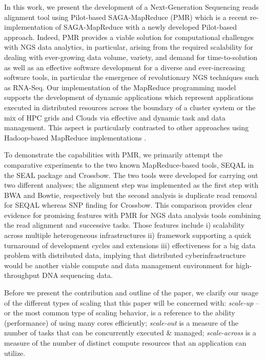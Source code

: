 \documentclass{sig-alternate}
\begin{document}
In this work, we present the development of a Next-Generation Sequencing reads alignment tool using Pilot-based SAGA-MapReduce (PMR) which is a recent re-implementation of SAGA-MapReduce with a newly developed Pilot-based approach\cite{Sehgal2011590,pmr2012,pstar11}.  Indeed, PMR provides a viable solution for computational challenges with NGS data analytics, in particular, arising from the required scalability for dealing with ever-growing data volume, variety, and demand for time-to-solution as well as an effective software development for a diverse and ever-increasing software tools, in particular the emergence of revolutionary NGS techniques such as RNA-Seq.  Our implementation of the MapReduce programming model supports the development of dynamic applications which represent applications executed in distributed resources across the boundary of a cluster system or the mix of HPC grids and Clouds via effective and dynamic task and data management.  This aspect is particularly contrasted to other approaches using Hadoop-based MapReduce implementations \cite{cloudburst,langmead2009,seal2011,langmead2010}.  

To demonstrate the capabilities with PMR, we primarily attempt the comparative experiments to the two known MapReduce-based tools, SEQAL in the SEAL package and Crossbow\cite{seal2011,lanmead2010}.  The two tools were developed for carrying out two different analyses; the alignment step was implemented as the first step with BWA and Bowtie, respectively but the second analysis is duplicate read removal for SEQAL whereas SNP finding for Crossbow.  This comparison provides clear evidence for promising features with PMR for NGS data analysis tools combining the read alignment and successive tasks.  Those features include i) scalability across multiple heterogeneous infrastructures ii) framework supporting a quick turnaround of development cycles and extensions iii) effectiveness for a big data problem with distributed data, implying that distributed cyberinfrastructure would be another viable compute and data management environment for high-throughput DNA sequencing data.  

Before we present the contribution and outline of the paper, we
clarify our usage of the different types of scaling that this paper
will be concerned with: {\it scale-up} -- or the most common type of
scaling behavior, is a reference to the ability (performance) of using
many cores efficiently; {\it scale-out} is a measure of the number of
tasks that can be concurrently executed \& managed; {\it scale-across}
is a measure of the number of distinct compute resources that an
application can utilize.
\end{document}
